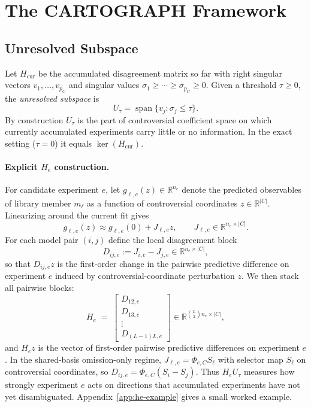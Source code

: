 \documentclass{article}
\newcommand{\real}{\mathbb{R}}
\theoremstyle{plain}
\theoremstyle{definition}
\theoremstyle{remark}
\begin{document}
\section{The CARTOGRAPH Framework}

\subsection{Unresolved Subspace}

Let $H_{\mathrm{cur}}$ be the accumulated disagreement matrix so far with
right singular vectors $v_1,\ldots,v_{p_C}$ and singular values
$\sigma_1\ge\cdots\ge\sigma_{p_C}\ge 0$. Given a threshold $\tau\ge 0$, the
\emph{unresolved subspace} is
\begin{equation}
U_\tau = \operatorname{span}\{v_j : \sigma_j \le \tau\}.
\end{equation}
By construction $U_\tau$ is the part of controversial coefficient space on
which currently accumulated experiments carry little or no information. In
the exact setting ($\tau=0$) it equals $\ker(H_{\mathrm{cur}})$.

\paragraph{Explicit $H_e$ construction.}
For candidate experiment $e$, let
$g_{\ell,e}(z)\in\real^{n_e}$ denote the predicted observables of library
member $m_\ell$ as a function of controversial coordinates
$z\in\real^{|C|}$. Linearizing around the current fit gives
\[
g_{\ell,e}(z)\approx g_{\ell,e}(0)+J_{\ell,e}z,
\qquad
J_{\ell,e}\in\real^{n_e\times |C|}.
\]
For each model pair $(i,j)$ define the local disagreement block
\[
D_{ij,e}:=J_{i,e}-J_{j,e}\in\real^{n_e\times |C|},
\]
so that $D_{ij,e} z$ is the first-order change in the pairwise predictive
difference on experiment $e$ induced by controversial-coordinate
perturbation $z$. We then stack all pairwise blocks:
\begin{equation}
H_e \;=\; \begin{bmatrix}
D_{12,e} \\
D_{13,e} \\
\vdots \\
D_{(L-1)L,e}
\end{bmatrix}
\in\real^{\binom{L}{2}n_e\times|C|},
\label{eq:He-construction}
\end{equation}
and $H_e z$ is the vector of first-order pairwise predictive differences on
experiment $e$. In the shared-basis omission-only regime,
$J_{\ell,e}=\Phi_{e,C}S_\ell$ with selector map $S_\ell$ on controversial
coordinates, so $D_{ij,e}=\Phi_{e,C}(S_i-S_j)$. Thus $H_eU_\tau$ measures
how strongly experiment $e$ acts on directions that accumulated experiments
have not yet disambiguated. Appendix~\ref{app:he-example} gives a small
worked example.
\end{document}
